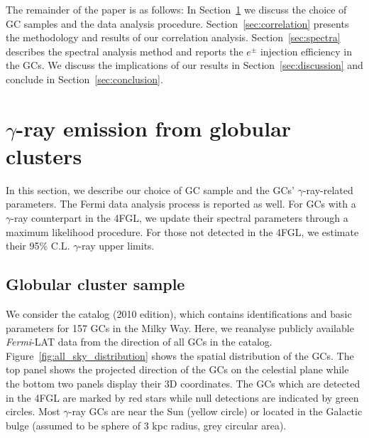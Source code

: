 \documentclass[doublespace,nopageskip]{VTthesis} %
\begin{document}
The remainder of the paper is as follows: In Section~\ref{sec:gamma_GCs} we discuss the choice of GC samples and the data analysis procedure. Section~\ref{sec:correlation} presents the methodology and results of our correlation analysis. Section~\ref{sec:spectra} describes the spectral analysis method and reports the $e^\pm$ injection efficiency in the GCs. We discuss the implications of our results in Section~\ref{sec:discussion} and conclude in Section~\ref{sec:conclusion}.

\section{$\gamma$-ray emission from globular clusters}\label{sec:gamma_GCs}

In this section, we describe our choice of GC sample and the GCs' $\gamma$-ray-related parameters. The Fermi data analysis process is reported as well. For GCs with a $\gamma$-ray counterpart in the 4FGL, we update their spectral parameters through a maximum likelihood procedure. For those not detected in the 4FGL, we estimate their 95\% C.L. $\gamma$-ray upper limits.

\subsection{Globular cluster sample}\label{sec:samples}

We consider the \citet{1996AJ....112.1487H} catalog (2010 edition), which contains identifications and basic parameters for 157 GCs in the Milky Way. Here, we reanalyse publicly available {\it Fermi}-LAT data from the direction of all GCs in the \citet{1996AJ....112.1487H} catalog. Figure~\ref{fig:all_sky_distribution} shows the spatial distribution of the GCs. The top panel shows the projected direction of the GCs on the celestial plane while the bottom two panels display their 3D coordinates. The GCs which are detected in the 4FGL are marked by red stars while null detections are indicated by green circles. Most $\gamma$-ray GCs are near the Sun (yellow circle) or located in the Galactic bulge (assumed to be sphere of 3 kpc radius, grey circular area).
\end{document}
